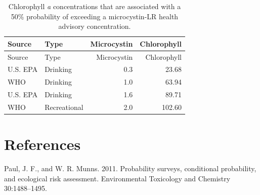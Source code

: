 \documentclass[11pt,]{article}
\begin{document}
\newpage

\begin{longtable}[c]{@{}llrr@{}}
\caption{Chlorophyll \textit{a} concentrations that are associated with
a 50\% probability of exceeding a microcystin-LR health advisory
concentration. \label{tab:mc_chla_table}}\tabularnewline
\toprule
Source & Type & Microcystin & Chlorophyll\tabularnewline
\midrule
\endfirsthead
\toprule
Source & Type & Microcystin & Chlorophyll\tabularnewline
\midrule
\endhead
U.S. EPA & Drinking & 0.3 & 23.68\tabularnewline
WHO & Drinking & 1.0 & 63.94\tabularnewline
U.S. EPA & Drinking & 1.6 & 89.71\tabularnewline
WHO & Recreational & 2.0 & 102.60\tabularnewline
\bottomrule
\end{longtable}

\newpage

\section*{References}\label{references}

Paul, J. F., and W. R. Munns. 2011. Probability surveys, conditional
probability, and ecological risk assessment. Environmental Toxicology
and Chemistry 30:1488--1495.
\end{document}
